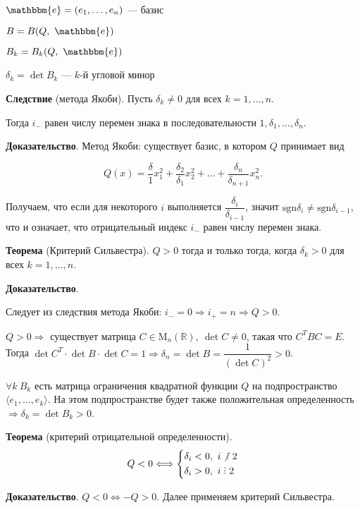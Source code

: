 \documentclass[a4paper, 12pt]{article}
\DeclareRobustCommand{\divby}{%
    \mathrel{\text{\vbox{\baselineskip.65ex\lineskiplimit0pt\hbox{.}\hbox{.}\hbox{.}}}}
}
\newcommand{\R}{\mathbb{R}}
\newcommand{\me}{\mathbbm{e}}
\newcommand*\circled[1]{\tikz[baseline=(char.base)]{
        \node[shape=circle,draw,inner sep=1.5pt] (char) {#1};}}
\begin{document}
$\me = (e_1, \ldots, e_n)$ --- базис

$B = B(Q,\ \me)$

$B_k = B_k(Q,\ \me)$

$\delta_k = \det B_k$ --- $k$-й угловой минор

\textbf{Следствие} (метода Якоби). Пусть $\delta_k \neq 0$ для всех $k = 1, \ldots, n$.

Тогда $i_-$ равен числу перемен знака в последовательности $1, \delta_1, \ldots, \delta_n$.

\textbf{Доказательство}. Метод Якоби: существует базис, в котором $Q$ принимает вид

\vspace{-3mm}
\[
Q(x) = \dfrac{\delta}{1}x_1^2 + \dfrac{\delta_2}{\delta_1}x_2^2 + \ldots + \dfrac{\delta_n}{\delta_{n + 1}}x_n^2.
\]

Получаем, что если для некоторого $i$ выполняется $\dfrac{\delta_i}{\delta_{i - 1}}$, значит $\text{sgn}\delta_i \neq \text{sgn}\delta_{i - 1}$, что и означает, что отрицательный индекс $i_-$ равен числу перемен знака.

\vspace{5mm}
\textbf{Теорема} (Критерий Сильвестра). $Q > 0$ тогда и только тогда, когда $\delta_k > 0$ для всех $k = 1, \ldots, n$.

\textbf{Доказательство}.

\circled{$\Leftarrow$} Следует из следствия метода Якоби: $i_- = 0 \Longrightarrow i_+ = n \Longrightarrow Q > 0$.

\circled{$\Rightarrow$} $Q > 0 \Longrightarrow$ существует матрица $C \in \text{M}_n(\R),\ \det C \neq 0$, такая что $C^TBC = E$. Тогда $\det C^T \cdot \det B \cdot \det C = 1 \Longrightarrow \delta_n = \det B = \dfrac{1}{(\det C)^2} > 0$.

$\forall k\ B_k$ есть матрица ограничения квадратной функции $Q$ на подпространство $\langle e_1, \ldots, e_k \rangle$. На этом подпространстве будет также положительная определенность $\Longrightarrow \delta_k = \det B_k > 0$.

\vspace{5mm}
\textbf{Теорема} (критерий отрицательной определенности).
\vspace{-3mm}
\[Q < 0 \Longleftrightarrow
\begin{cases*}
\delta_i < 0,\ i \not{\divby}\ 2 \\
\delta_i > 0,\ i \divby 2
\end{cases*}
\]

\vspace{-3mm}
\textbf{Доказательство}. $Q < 0 \Longleftrightarrow -Q > 0$. Далее применяем критерий Сильвестра.
\end{document}
